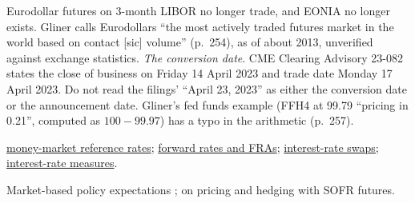 \begin{qfmethod}
 Eurodollar futures on 3-month LIBOR no longer trade, and EONIA no longer exists. Gliner calls Eurodollars ``the most actively traded futures market in the world based on contact [sic] volume'' (p.~254), as of about 2013, unverified against exchange statistics. \emph{The conversion date}. CME Clearing Advisory 23-082 states the close of business on Friday 14 April 2023 and trade date Monday 17 April 2023. Do not read the filings' ``April 23, 2023'' as either the conversion date or the announcement date. Gliner's fed funds example (FFH4 at 99.79 ``pricing in 0.21'', computed as $100-99.97$) has a typo in the arithmetic (p.~257).

 \hyperref[def:money-market-reference-rates]{money-market reference rates}; \hyperref[mod:forward-rates-fra]{forward rates and FRAs}; \hyperref[def:interest-rate-swaps]{interest-rate swaps}; \hyperref[def:interest-rate-measures]{interest-rate measures}.

 Market-based policy expectations \citep{rt-kuttner-2001}; \citep{gap-rates-sofr-futures-hedging} on pricing and hedging with SOFR futures.

\end{qfmethod}
